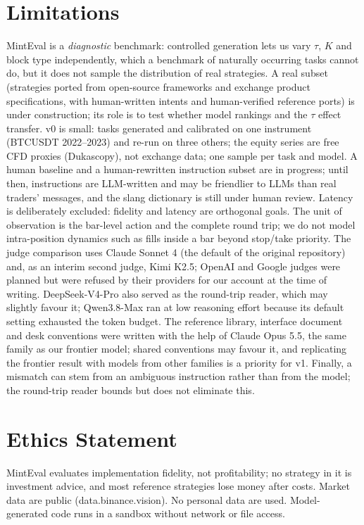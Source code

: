 \documentclass[sigconf,nonacm]{acmart}
\begin{document}
\section{Limitations}\label{sec:limits}
MintEval is a \emph{diagnostic} benchmark: controlled generation lets us vary $\tau$, $K$ and block
type independently, which a benchmark of naturally occurring tasks cannot do, but it does not
sample the distribution of real strategies. A real subset (strategies ported from open-source
frameworks and exchange product specifications, with human-written intents and human-verified
reference ports) is under construction; its role is to test whether model rankings and the $\tau$
effect transfer. v0 is small: \NTasks{} tasks generated and calibrated on one instrument (BTCUSDT 2022--2023) and
re-run on three others; the equity series are free CFD proxies (Dukascopy), not exchange data; one
sample per task and model. A human baseline and a human-rewritten instruction subset are in progress; until
then, instructions are LLM-written and may be friendlier to LLMs than real traders' messages, and
the slang dictionary is still under human review. Latency is deliberately excluded: fidelity and
latency are orthogonal goals. The unit of observation is the bar-level action and the complete
round trip; we do not model intra-position dynamics such as fills inside a bar beyond stop/take
priority. The judge comparison uses Claude Sonnet 4 (the default of the original repository) and, as an
interim second judge, Kimi K2.5; OpenAI and Google judges were planned but were refused by their
providers for our account at the time of writing. DeepSeek-V4-Pro also served as the round-trip
reader, which may slightly favour it; Qwen3.8-Max ran at low reasoning effort because its default
setting exhausted the token budget. The reference library, interface document and desk conventions were written with the help of
Claude Opus 5.5, the same family as our frontier model; shared conventions may favour it, and
replicating the frontier result with models from other families is a priority for v1. Finally, a mismatch can stem from an ambiguous instruction rather than from the model;
the round-trip reader bounds but does not eliminate this.

\section*{Ethics Statement}
MintEval evaluates implementation fidelity, not profitability; no strategy in it is
investment advice, and most reference strategies lose money after costs. Market data are public
(data.binance.vision). No personal data are used. Model-generated code runs in a sandbox
without network or file access.
\end{document}
